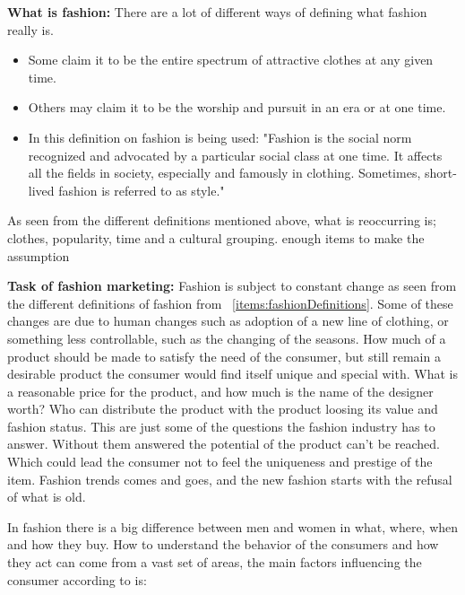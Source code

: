 \textbf{What is fashion:}
There are a lot of different ways of defining what fashion really is.

\begin{itemize}
    \item Some claim it to be the entire spectrum of attractive clothes at any given time.
    \item Others may claim it to be the worship and pursuit in an era or at one
    time.
    \item In \cite{Fang2012} this definition on fashion is being used: "Fashion is
    the social norm recognized and advocated by a particular social class at one
    time. It affects all the fields in society, especially and famously in
    clothing. Sometimes, short-lived fashion is referred to as style."
    \label{items:fashionDefinitions}
\end{itemize}

As seen from the different definitions mentioned above, what is reoccurring is;
clothes, popularity, time and a cultural grouping.
enough items to make the assumption

\textbf{Task of fashion marketing:}
Fashion is subject to constant change as seen from the different definitions of fashion from ~\ref{items:fashionDefinitions}.
Some of these changes are due to human changes such as adoption of a new line of clothing, or something less controllable, such as the changing of the seasons.
How much of a product should be made to satisfy the need of the consumer, but still remain a desirable product the consumer would find itself unique and special with.
What is a reasonable price for the product, and how much is the name of the designer worth?
Who can distribute the product with the product loosing its value and fashion status.
This are just some of the questions the fashion industry has to answer.
Without them answered the potential of the product can't be reached.
Which could lead the consumer not to feel the uniqueness and prestige of the item.
Fashion trends comes and goes, and the new fashion starts with the refusal of what is old.


In fashion there is a big difference between men and women in what, where, when
and how they buy.  How to understand the behavior of the consumers and how they
act can come from a vast set of areas, the main factors influencing the consumer according to \cite{kotler2009marketing} is:

